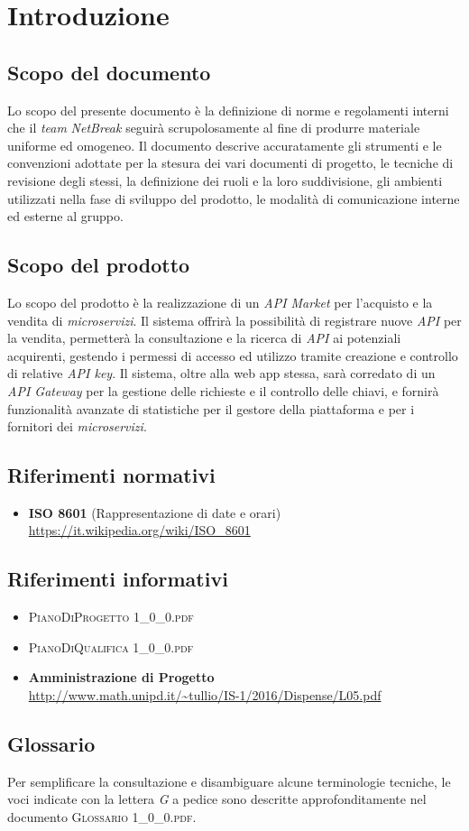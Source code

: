 \newpage
\section{Introduzione}

\subsection{Scopo del documento}
Lo scopo del presente documento è la definizione di norme e regolamenti interni che il \textit{team} \textit{NetBreak} seguirà scrupolosamente al fine di produrre materiale uniforme ed omogeneo. Il documento descrive accuratamente gli strumenti e le convenzioni adottate per la stesura dei vari documenti di progetto, le tecniche di revisione degli stessi, la definizione dei ruoli e la loro suddivisione, gli ambienti utilizzati nella fase di sviluppo del prodotto, le modalità di comunicazione interne ed esterne al gruppo.

\subsection{Scopo del prodotto}
Lo scopo del prodotto è la realizzazione di un \textit{API Market} per l'acquisto e la vendita di \textit{microservizi}. Il sistema offrirà la possibilità di registrare nuove \textit{API} per la vendita, permetterà la consultazione e la ricerca di \textit{API} ai potenziali acquirenti, gestendo i permessi di accesso ed utilizzo tramite creazione e controllo di relative \textit{API key}. Il sistema, oltre alla web app stessa, sarà corredato di un \textit{API Gateway} per la gestione delle richieste e il controllo delle chiavi, e fornirà funzionalità avanzate di statistiche per il gestore della piattaforma e per i fornitori dei \textit{microservizi}.

\subsection{Riferimenti normativi}
\begin{itemize}
	\item \textbf{ISO 8601} (Rappresentazione di date e orari)\\
	\url{https://it.wikipedia.org/wiki/ISO\_8601}
\end{itemize}

\subsection{Riferimenti informativi}
\begin{itemize}
	\item \textsc{PianoDiProgetto 1\_0\_0.pdf}
	\item \textsc{PianoDiQualifica 1\_0\_0.pdf}
	\item \textbf{Amministrazione di Progetto}\\
	\url{http://www.math.unipd.it/~tullio/IS-1/2016/Dispense/L05.pdf}
\end{itemize}

\subsection{Glossario}
Per semplificare la consultazione e disambiguare alcune terminologie tecniche, le voci indicate con la lettera \textit{G} a pedice sono descritte approfonditamente nel documento \textsc{Glossario 1\_0\_0.pdf}.